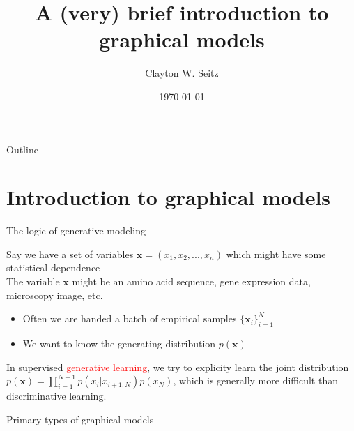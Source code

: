 \documentclass{beamer}					%
\title{A (very) brief introduction to graphical models}	%
\author{Clayton W. Seitz}								%
\date{\today}									%
\begin{document}
\begin{frame}
  \titlepage
\end{frame}

\begin{frame}{Outline}
  \tableofcontents
\end{frame}

%


\section{Introduction to graphical models}

\begin{frame}{The logic of generative modeling}

Say we have a set of variables $\mathbf{x} = (x_{1},x_{2},...,x_{n})$ which might have some statistical dependence\\
\vspace{0.1in}
The variable $\mathbf{x}$ might be an amino acid sequence, gene expression data, microscopy image, etc.\\
\vspace{0.1in}
\begin{itemize}
\item Often we are handed a batch of empirical samples $\{\mathbf{x}_{i}\}_{i=1}^{N}$
\item We want to know the generating distribution $p(\mathbf{x})$
\end{itemize}

In supervised \textcolor{red}{generative learning}, we try to explicity learn the joint distribution $p(\mathbf{x}) = \prod_{i=1}^{N-1}p(x_{i}|x_{i+1:N})p(x_{N})$, which is generally more difficult than discriminative learning. 

\end{frame}

\begin{frame}{Primary types of graphical models}

\end{frame}
\end{document}
